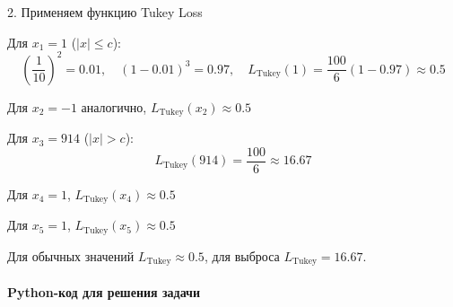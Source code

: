 2. Применяем функцию Tukey Loss

Для $x_1 = 1$ ($|x| \leq c$):
\[
\left(\frac{1}{10}\right)^2 = 0.01, \quad (1 - 0.01)^3 = 0.97, \quad L_{\text{Tukey}}(1) = \frac{100}{6}(1 - 0.97) \approx 0.5
\]

Для $x_2 = -1$ аналогично, $L_{\text{Tukey}}(x_2) \approx 0.5$

Для $x_3 = 914$ ($|x| > c$):
\[
L_{\text{Tukey}}(914) = \frac{100}{6} \approx 16.67
\]

Для $x_4 = 1$, $L_{\text{Tukey}}(x_4) \approx 0.5$

Для $x_5 = 1$, $L_{\text{Tukey}}(x_5) \approx 0.5$

Для обычных значений $L_{\text{Tukey}} \approx 0.5$, для выброса $L_{\text{Tukey}} = 16.67$.
\paragraph*{Python-код для решения задачи}
